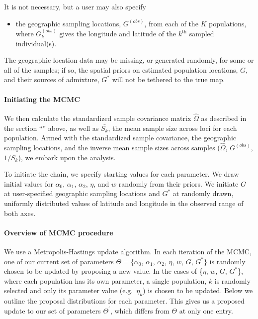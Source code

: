 \documentclass[10pt,letterpaper]{article}
\newcommand{\identifyadmixsource}[1]{{#1^{*}}}
\newcommand{\secref}[1]{``\nameref{#1}''}
\begin{document}
It is not necessary, but a user may also specify 
\begin{itemize}
  \item the geographic sampling locations, $G^{(obs)}$, from each of the $K$ populations, where $G^{(obs)}_k$ gives the longitude and latitude of the $k^\mathrm{th}$ sampled individual(s).
\end{itemize}

The geographic location data may be missing, or generated randomly, for some or all of the samples; if so, the spatial priors on estimated population locations, $G$, and their sources of admixture, $\identifyadmixsource{G}$ will not be tethered to the true map. 

\paragraph{Initiating the MCMC}
We then calculate the standardized sample covariance matrix $\widehat{\Omega}$ as described in the section \secref{ss:cov_methods} above,
as well as $\bar{S_k}$, the mean sample size across loci for each population.
Armed with the standardized sample covariance, the geographic sampling locations, and the inverse mean sample sizes across samples ($\widehat{\Omega}$, $G^{(obs)}$, $1/\bar{S_k}$), we embark upon the analysis.

To initiate the chain, we specify starting values for each parameter.  We draw initial values for $\alpha_0$, $\alpha_1$, $\alpha_2$, $\eta$, and $w$ randomly from their priors.  We initiate $G$ at user-specified geographic sampling locations and $\identifyadmixsource{G}$ at randomly drawn, uniformly distributed values of latitude and longitude in the observed range of both axes.  

\paragraph{Overview of MCMC procedure}
We use a Metropolis-Hastings update algorithm. 
In each iteration of the MCMC, one of our current set of parameters 
$\Theta= \{\alpha_0$, $\alpha_1$, $\alpha_2$, $\eta$, $w$, $G$, $\identifyadmixsource{G}\}$ 
is randomly chosen to be updated by proposing a new value.  
In the cases of \{$\eta$, $w$, $G$, $\identifyadmixsource{G}$\}, where each population has its own parameter, a single population, $k$ 
is randomly selected and only its parameter value (e.g.\ $\eta_k$) is chosen to be updated. 
Below we outline the proposal distributions for each parameter. 
This gives us a proposed update to our set of parameters $\Theta^{\prime}$, which differs from $\Theta$ at only one entry.
\end{document}
